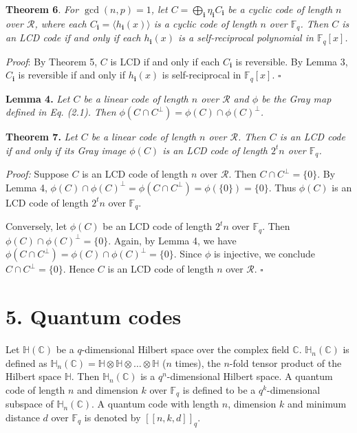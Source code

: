 \documentclass[12pt]{article}
\begin{document}
\textbf{Theorem 6}. \textit{For $\gcd(n, p) = 1$, let $C = \bigoplus\limits_{\mathbf{i}} \eta_{\mathbf{i}} C_{\mathbf{i}}$ be a cyclic code of length $n$ over $\mathcal{R}$, where each $C_{\mathbf{i}} = \langle h_{\mathbf{i}}(x) \rangle$ is a cyclic code of length $n$ over $\mathbb{F}_q$. Then $C$ is an LCD code if and only if each $h_{\mathbf{i}}(x)$ is a self-reciprocal polynomial in $\mathbb{F}_q[x]$.}

\textit{Proof}: By Theorem 5, $C$ is LCD if and only if each $C_{\mathbf{i}}$ is reversible. By Lemma 3, $C_{\mathbf{i}}$ is reversible if and only if $h_{\mathbf{i}}(x)$ is self-reciprocal in $\mathbb{F}_q[x]$. $\square$

\textbf{Lemma 4.} \textit{Let $C$ be a linear code of length $n$ over $\mathcal{R}$ and $\phi$ be the Gray map defined in Eq. (2.1). Then $\phi(C \cap C^{\perp}) = \phi(C) \cap \phi(C)^{\perp}$.}

\textbf{Theorem 7.} \textit{Let $C$ be a linear code of length $n$ over $\mathcal{R}$. Then $C$ is an LCD code if and only if its Gray image $\phi(C)$ is an LCD code of length $2^t n$ over $\mathbb{F}_q$.}

\textit{Proof:} Suppose $C$ is an LCD code of length $n$ over $\mathcal{R}$. Then $C \cap C^{\perp} = \{0\}$. By Lemma 4, $\phi(C) \cap \phi(C)^{\perp} = \phi(C \cap C^{\perp}) = \phi(\{0\}) = \{0\}$. Thus $\phi(C)$ is an LCD code of length $2^t n$ over $\mathbb{F}_q$.

Conversely, let $\phi(C)$ be an LCD code of length $2^t n$ over $\mathbb{F}_q$. Then $\phi(C) \cap \phi(C)^{\perp} = \{0\}$. Again, by Lemma 4, we have $\phi(C \cap C^{\perp}) = \phi(C) \cap \phi(C)^{\perp} = \{0\}$. Since $\phi$ is injective, we conclude $C \cap C^{\perp} = \{0\}$. Hence $C$ is an LCD code of length $n$ over $\mathcal{R}$. $\square$

\section*{5. Quantum codes}

Let $\mathbb{H}(\mathbb{C})$ be a $q$-dimensional Hilbert space over the complex field $\mathbb{C}$. $\mathbb{H}_n(\mathbb{C})$ is defined as $\mathbb{H}_n(\mathbb{C}) = \mathbb{H} \otimes \mathbb{H} \otimes \dots \otimes \mathbb{H}$ ($n$ times), the $n$-fold tensor product of the Hilbert space $\mathbb{H}$. Then $\mathbb{H}_n(\mathbb{C})$ is a $q^n$-dimensional Hilbert space. A quantum code of length $n$ and dimension $k$ over $\mathbb{F}_q$ is defined to be a $q^k$-dimensional subspace of $\mathbb{H}_n(\mathbb{C})$. A quantum code with length $n$, dimension $k$ and minimum distance $d$ over $\mathbb{F}_q$ is denoted by $[[n, k, d]]_q$.
\end{document}
